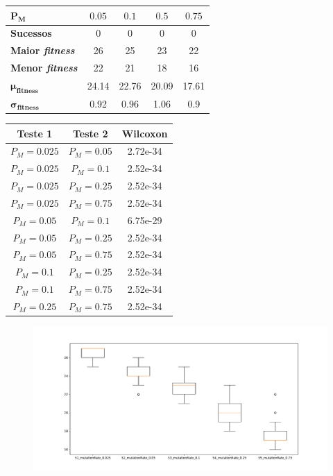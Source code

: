 \documentclass[11pt,a4paper]{article}
\begin{document}
\begin{minipage}{0.53\linewidth}
\footnotesize
\begin{tabular}{|l|c|c|c|c|}
\hline
$\boldsymbol{P_M}$ & $0.05$& $0.1$& $0.5$& $0.75$\\
\hline
\textbf{Sucessos} & 0 & 0 & 0 & 0 \\ 
\hline 
\textbf{Maior \textit{fitness}} & 26 & 25 & 23 & 22 \\ 
\hline
\textbf{Menor \textit{fitness}} & 22 & 21 & 18 & 16\\
\hline
$\boldsymbol{\mu}_{\boldsymbol{fitness}}$ & 24.14 & 22.76 & 20.09 & 17.61\\
\hline
$\boldsymbol{\sigma}_{\boldsymbol{fitness}}$ & 0.92 & 0.96 & 1.06 & 0.9\\
\hline
\end{tabular}
\end{minipage}
\begin{minipage}{0.47\linewidth}
\footnotesize
\begin{tabular}{|c|c|c|}
\hline
\textbf{Teste 1} & \textbf{Teste 2} & \textbf{Wilcoxon} \\\hline
$P_M = 0.025$ & $P_M = 0.05$ & 2.72e-34\\\hline
$P_M = 0.025$ & $P_M = 0.1$ & 2.52e-34\\\hline
$P_M = 0.025$ & $P_M = 0.25$ & 2.52e-34\\\hline
$P_M = 0.025$ & $P_M = 0.75$ & 2.52e-34\\\hline
$P_M = 0.05$ & $P_M = 0.1$ & 6.75e-29\\\hline
$P_M = 0.05$ & $P_M = 0.25$ & 2.52e-34\\\hline
$P_M = 0.05$ & $P_M = 0.75$ & 2.52e-34\\\hline
$P_M = 0.1$ & $P_M = 0.25$ & 2.52e-34\\\hline
$P_M = 0.1$ & $P_M = 0.75$ & 2.52e-34\\\hline
$P_M = 0.25$ & $P_M = 0.75$ & 2.52e-34\\\hline
\end{tabular}
\end{minipage}

\begin{figure}[!ht]
\centering
\includegraphics[scale=0.46]{teste5.pdf}
\end{figure}
\end{document}
